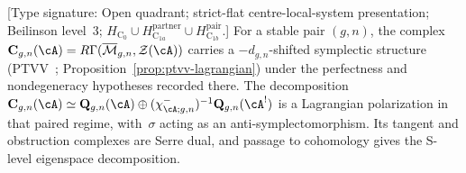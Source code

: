 \begin{remark}\label{rem:homotopy-native-c}
\textup{[Type signature: Open quadrant; strict-flat
centre-local-system presentation; Beilinson level~3;
\(H_{\mathrm C_0}\cup H_{\mathrm C_{1a}}^{\mathrm{partner}}
\cup H_{\mathrm C_{1b}}^{\mathrm{pair}}\).]}
For a stable pair \((g,n)\), the complex
$\mathbf{C}_{g,n}(\cA)=R\Gamma(\overline{\mathcal{M}}_{g,n},
\mathcal{Z}(\cA))$ carries a $-d_{g,n}$-shifted symplectic structure
(PTVV~\cite{PTVV13}; Proposition~\ref{prop:ptvv-lagrangian})
under the perfectness and nondegeneracy hypotheses recorded there.
The decomposition
$\mathbf{C}_{g,n}(\cA)\simeq\mathbf{Q}_{g,n}(\cA)\oplus
(\chi^-_{\cA;g,n})^{-1}\mathbf{Q}_{g,n}(\cA^!)$ is a Lagrangian
polarization in that paired regime, with~$\sigma$ acting as an
anti-symplectomorphism.  Its tangent and obstruction complexes are
Serre dual, and passage to cohomology gives the S-level eigenspace
decomposition.
\end{remark}

